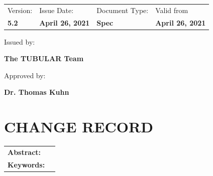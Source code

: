 \documentclass[a4paper,12pt,oneside]{article}
\begin{document}
\begin{flushleft}
\begin{tabular}{p{} p{} p{} p{}}
\footnotesize{Version:}     & \footnotesize{Issue Date:} & \footnotesize{Document Type:} & \footnotesize{Valid from} \\
\textbf{5.2}          & \textbf{April 26, 2021}    & \textbf{Spec}   & \textbf{April 26, 2021}  
\end{tabular}

\vspace{10pt}

\small
{
Issued by:\\
}

\vspace{0.3cm}

\large
{
\textbf{The TUBULAR Team} \\
}

\vspace{0.3cm}

\small
{
Approved by:\\
}

\vspace{0.3cm}

\large
{
\textbf{Dr. Thomas Kuhn}
}
\end{flushleft}




\pagestyle{firstp}
\section*{\small{\textbf{CHANGE RECORD}}}
%


\newpage

\vspace{1cm}
\begin{tabular}{p{} p{}}
\textbf{Abstract:}     &  \\ %
\textbf{Keywords:}     & %

\end{tabular}

\vfill

\newpage
\tableofcontents

\newpage


\newpage

\end{document}
